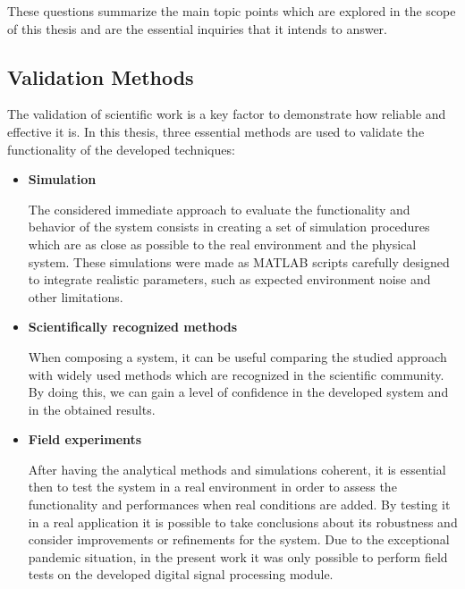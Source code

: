 These questions summarize the main topic points which are explored in the scope of this thesis and are the essential inquiries that it intends to answer.

\subsection{Validation Methods} \label{sec:validation}

The validation of scientific work is a key factor to demonstrate how reliable and effective it is. In this thesis, three essential methods are used to validate the functionality of the developed techniques:

\begin{itemize}
	
	\item \textbf{Simulation}
	
	The considered immediate approach to evaluate the functionality and behavior of the system consists in creating a set of simulation procedures which are as close as possible to the real environment and the physical system. These simulations were made as MATLAB scripts carefully designed to integrate realistic parameters, such as expected environment noise and other limitations.
	
	\item \textbf{Scientifically recognized methods}
	
	When composing a system, it can be useful comparing the studied approach with widely used methods which are recognized in the scientific community. By doing this, we can gain a level of confidence in the developed system and in the obtained results.
	
	\item \textbf{Field experiments}
	
	After having the analytical methods and simulations coherent, it is essential then to test the system in a real environment in order to assess the functionality and performances when real conditions are added. By testing it in a real application it is possible to take conclusions about its robustness and consider improvements or refinements for the system.
	Due to the exceptional pandemic situation, in the present work it was only possible to perform field tests on the developed digital signal processing module. 
	
\end{itemize}


